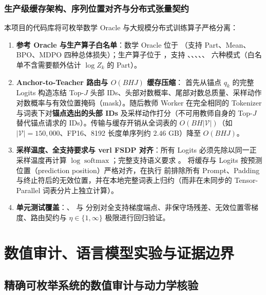 \documentclass[lang=cn,scheme=chinese,openany]{elegantbook}
\begin{document}
\section{生产级缓存架构、序列位置对齐与分布式张量契约}
\label{opd:production-contract}

本项目的代码库将可枚举数学 Oracle 与大规模分布式训练算子严格分离：
\begin{enumerate}
\item \textbf{参考 Oracle 与生产算子白名单}：数学 Oracle 位于 （支持 Part、Mean、BPO、MDPO 四种总体损失）；生产算子位于 ，支持 、、、、、 六种模式（白名单不含需要额外估计 $\log Z_k$ 的 Part）。
\item \textbf{Anchor-to-Teacher 路由与 $O(BHJ)$ 缓存压缩}： 首先从锚点 $q_k$ 的完整 Logits 构造冻结 Top-$J$ 头部 IDs、头部对数概率、尾部对数总质量、采样动作对数概率与有效位置掩码（mask）。随后教师 Worker 在完全相同的 Tokenizer 与词表下对\textbf{锚点选出的头部 IDs} 及采样动作打分（不可用教师自身的 Top-$J$ 替代锚点请求的 IDs）。传输与缓存开销从全词表的 $O(BH|\mathcal V|)$（如 $|\mathcal V|=150{,}000$、FP16、8192 长度单序列约 $2.46$ GB）降至 $O(BHJ)$。
\item \textbf{采样温度、全支持要求与 verl FSDP 对齐}：所有 Logits 必须先除以同一正采样温度再计算 $\log\operatorname{softmax}$；完整支持语义要求 。 将缓存与 Logits 按预测位置（prediction position）严格对齐，在执行  前排除所有 Prompt、Padding 与终止符后的无效位置，并在本地完整词表上归约（而非在未同步的 Tensor-Parallel 词表分片上独立计算）。
\item \textbf{单元测试覆盖}：、 与  分别对全支持梯度端点、非保守场残差、无效位置零梯度、路由契约与 $\eta\in\{1,\infty\}$ 极限进行回归验证。
\end{enumerate}

\part{数值审计、语言模型实验与证据边界}

\chapter{精确可枚举系统的数值审计与动力学核验}
\label{evidence:chapter}
\end{document}
